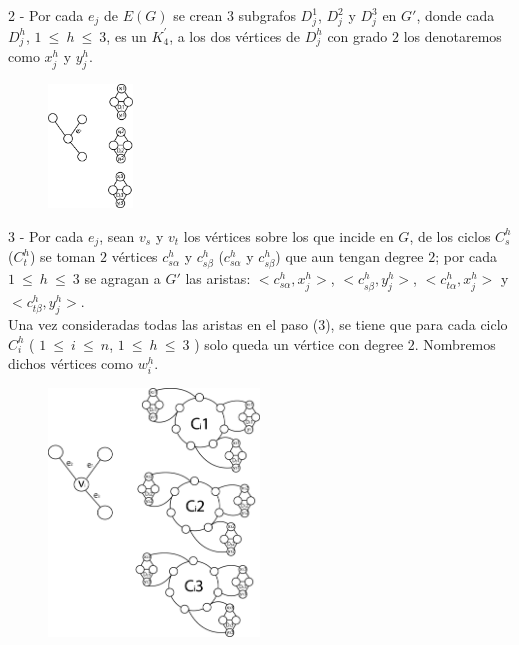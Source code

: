 \documentclass{article}
\begin{document}
2 - Por cada $e_j$ de $E(G)$ se crean $3$ subgrafos $D_{j}^1$, $D_{j}^2$ y $D_{j}^3$ en $G'$, donde cada $D_{j}^h$, $1~ \leq~h~\leq ~3$,  es un $K^{'}_4$, a los dos v\'ertices 
de $D_{j}^h$ con grado $2$ los denotaremos como $x_{j}^h$ y $y_{j}^h$.\\
\begin{figure}
    \centering
    \includegraphics[width= 0.2\textwidth ]{img2.png}
\end{figure}


3 - Por cada $e_j$, sean $v_s$ y $v_t$ los v\'ertices sobre los que incide en $G$, de los ciclos $C_s^h$ ($C_t^h$) se toman $2$ v\'ertices 
$c_{s\alpha}^h$ y $c_{s\beta}^h$ ($c_{s\alpha}^h$ y $c_{s\beta}^h$) que aun tengan degree $2$; por cada $1~\leq ~h ~\leq~ 3$ se agragan a $G'$ las aristas: $<c_{s\alpha}^h, x_{j}^h>$, $<c_{s\beta}^h, y_{j}^h>$, 
$<c_{t\alpha}^h, x_{j}^h>$ y $<c_{t\beta}^h, y_{j}^h>$.\\ 

Una vez consideradas todas las aristas en el paso (3), se tiene que para cada ciclo $C_i^h$ ( $1~\leq ~i ~\leq~ n$, $1~\leq ~h ~\leq~ 3$ )
solo queda un v\'ertice con degree $2$. Nombremos dichos v\'ertices como $w_i^h$.\\ 
\begin{figure}[!h]
    \centering
    \includegraphics[width= 0.5\textwidth ]{img3.png}
\end{figure}
\end{document}
